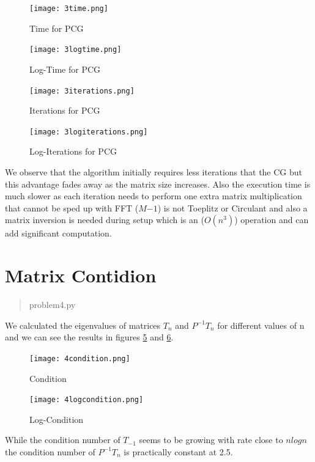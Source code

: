 \documentclass[a4paper]{article}
\begin{document}
\begin{figure}[H]
	\centering
	\texttt{[image: 3time.png]}
	\caption{Time for PCG}
	\label{fig:3timegdcg}
\end{figure}

\begin{figure}[H]
	\centering
	\texttt{[image: 3logtime.png]}
	\caption{Log-Time for PCG}
	\label{fig:3logtimegdcg}
\end{figure}

\begin{figure}[H]
	\centering
	\texttt{[image: 3iterations.png]}
	\caption{Iterations for PCG}
	\label{fig:3itgdcg}
\end{figure}

\begin{figure}[H]
	\centering
	\texttt{[image: 3logiterations.png]}
	\caption{Log-Iterations for PCG}
	\label{fig:3logitgdcg}
\end{figure}

We observe that the algorithm initially requires less iterations that the CG but this advantage fades away as the matrix size increases. Also the execution time is much slower as each iteration needs to perform one extra matrix multiplication that cannot be sped up with FFT ($M{-1}$) is not Toeplitz or Circulant and also a matrix inversion is needed during setup which is an ($O(n^3)$) operation and can add significant computation.

\section{Matrix Contidion}
\begin{quote}
	problem4.py
\end{quote}
We calculated the eigenvalues of matrices $T_n$ and $P^{-1}T_n$ for different values of n and we can see the results in figures \ref{fig:4condition} and \ref{fig:4logcondition}.

\begin{figure}[H]
	\centering
	\texttt{[image: 4condition.png]}
	\caption{Condition}
	\label{fig:4condition}
\end{figure}

\begin{figure}[H]
	\centering
	\texttt{[image: 4logcondition.png]}
	\caption{Log-Condition}
	\label{fig:4logcondition}
\end{figure}

While the condition number of $T_{-1}$ seems to be growing with rate close to $nlogn$ the condition number of $P^{-1}T_n$ is practically constant at 2.5.
\end{document}
